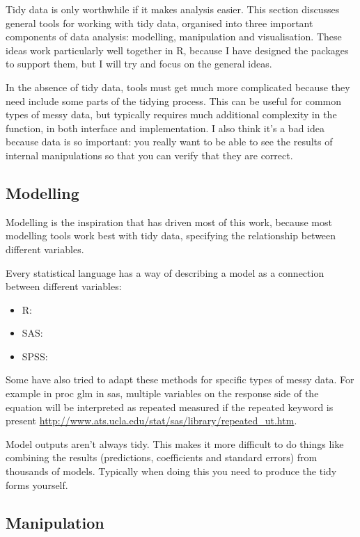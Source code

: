 \documentclass[oneside]{article}
\begin{document}
Tidy data is only worthwhile if it makes analysis easier. This section discusses general tools for working with tidy data, organised into three important components of data analysis: modelling, manipulation and visualisation. These ideas work particularly well together in R, because I have designed the packages to support them, but I will try and focus on the general ideas.

In the absence of tidy data, tools must get much more complicated because they need include some parts of the tidying process. This can be useful for common types of messy data, but typically requires much additional complexity in the function, in both interface and implementation. I also think it's a bad idea because data is so important: you really want to be able to see the results of internal manipulations so that you can verify that they are correct. 

\subsection{Modelling}

Modelling is the inspiration that has driven most of this work, because most modelling tools work best with tidy data, specifying the relationship between different variables. 

Every statistical language has a way of describing a model as a connection between different variables:

\begin{itemize}

\item R:
\item SAS:
\item SPSS:
\end{itemize}

Some have also tried to adapt these methods for specific types of messy data. For example in {\sc proc glm} in {\sc sas}, multiple variables on the response side of the equation will be interpreted as repeated measured if the {\sc repeated} keyword is present \url{http://www.ats.ucla.edu/stat/sas/library/repeated_ut.htm}.

Model outputs aren't always tidy. This makes it more difficult to do things like combining the results (predictions, coefficients and standard errors) from thousands of models. Typically when doing this you need to produce the tidy forms yourself.

\subsection{Manipulation}
\end{document}
